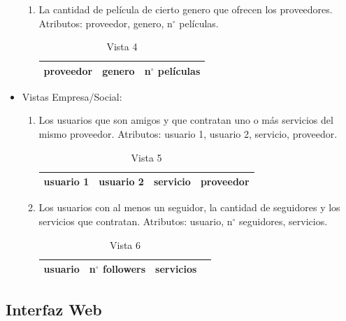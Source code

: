 \documentclass[12pt,letterpaper]{article}
\begin{document}
\begin{itemize}
\begin{enumerate}
		\item La cantidad de película de cierto genero que ofrecen los proveedores. Atributos: proveedor, genero, n$^\circ$ películas.
		
		\begin{table}[ht!]
			\centering
			\begin{tabular}{||c|l|l||} \hline 
				proveedor & genero & n$^\circ$ películas \\ \hline
			\end{tabular}
			\caption {Vista 4}  
		\end{table}		
		
	\end{enumerate}
	
	\item Vistas Empresa/Social:
	
	\begin{enumerate}
		\item Los usuarios que son amigos y que contratan uno o más servicios del mismo proveedor. Atributos: usuario 1, usuario 2, servicio, proveedor.
		
		\begin{table}[ht!]
			\centering
			\begin{tabular}{||c|l|l|l||} \hline 
				usuario 1 & usuario 2 & servicio & proveedor\\ \hline
			\end{tabular}
			\caption {Vista 5}  
		\end{table}
		
		\item Los usuarios con al menos un seguidor, la cantidad de seguidores y los servicios que contratan. Atributos: usuario, n$^\circ$ seguidores, servicios.
		
		\begin{table}[ht!]
			\centering
			\begin{tabular}{||c|l|l|l||} \hline 
				usuario & n$^\circ$ followers & servicios \\ \hline
			\end{tabular}
			\caption {Vista 6}  
		\end{table}
		
	\end{enumerate}

\end{itemize}


\subsection{Interfaz Web}
\end{document}
